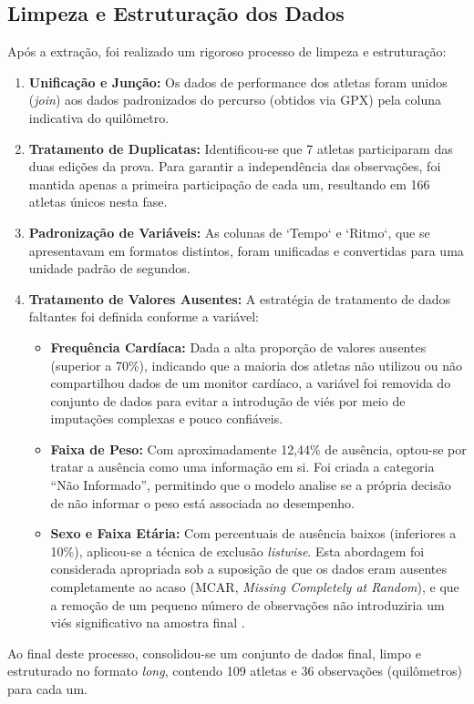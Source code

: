 \subsection{Limpeza e Estruturação dos Dados}
\label{subsec:limpeza}

Após a extração, foi realizado um rigoroso processo de limpeza e estruturação:
\begin{enumerate}
    \item \textbf{Unificação e Junção:} Os dados de performance dos atletas foram unidos (\emph{join}) aos dados padronizados do percurso (obtidos via GPX) pela coluna indicativa do quilômetro.
    
    \item \textbf{Tratamento de Duplicatas:} Identificou-se que 7 atletas participaram das duas edições da prova. Para garantir a independência das observações, foi mantida apenas a primeira participação de cada um, resultando em 166 atletas únicos nesta fase.
    
    \item \textbf{Padronização de Variáveis:} As colunas de `Tempo` e `Ritmo`, que se apresentavam em formatos distintos, foram unificadas e convertidas para uma unidade padrão de segundos.
    
    \item \textbf{Tratamento de Valores Ausentes:} A estratégia de tratamento de dados faltantes foi definida conforme a variável:
    \begin{itemize}
        \item \textbf{Frequência Cardíaca:} Dada a alta proporção de valores ausentes (superior a 70\%), indicando que a maioria dos atletas não utilizou ou não compartilhou dados de um monitor cardíaco, a variável foi removida do conjunto de dados para evitar a introdução de viés por meio de imputações complexas e pouco confiáveis.
        \item \textbf{Faixa de Peso:} Com aproximadamente 12,44\% de ausência, optou-se por tratar a ausência como uma informação em si. Foi criada a categoria ``Não Informado'', permitindo que o modelo analise se a própria decisão de não informar o peso está associada ao desempenho.
        \item \textbf{Sexo e Faixa Etária:} Com percentuais de ausência baixos (inferiores a 10\%), aplicou-se a técnica de exclusão \textit{listwise}. Esta abordagem foi considerada apropriada sob a suposição de que os dados eram ausentes completamente ao acaso (MCAR, \textit{Missing Completely at Random}), e que a remoção de um pequeno número de observações não introduziria um viés significativo na amostra final \citep[para uma discussão, ver][]{rubin1976}.
    \end{itemize}
\end{enumerate}
Ao final deste processo, consolidou-se um conjunto de dados final, limpo e estruturado no formato \emph{long}, contendo 109 atletas e 36 observações (quilômetros) para cada um.

